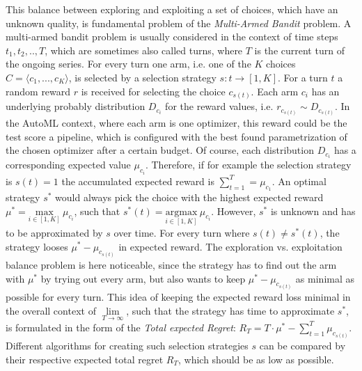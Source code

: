 This balance between exploring and exploiting a set of choices, which have an unknown quality, is fundamental problem of the \textit{Multi-Armed Bandit} problem.
A multi-armed bandit problem is usually considered in the context of time steps $t_1, t_2, .., T$, which are sometimes also called turns, where $T$ is the current turn of the ongoing series.
For every turn one arm, i.e. one of the $K$ choices $C = \langle c_1, ..., c_K \rangle$, is selected by a selection strategy $s: t \rightarrow [1,K]$.\newline
For a turn $t$ a random reward $r$ is received for selecting the choice $c_{s(t)}$.
Each arm $c_i$ has an underlying probably distribution $D_{c_i}$ for the reward values, i.e. $r_{c_{s(t)}} \sim D_{c_{s(t)}}$.
In the AutoML context, where each arm is one optimizer, this reward could be the test score a pipeline, which is configured with the best found parametrization of the chosen optimizer after a certain budget.\newline
Of course, each distribution $D_{c_i}$ has a corresponding expected value $\mu_{c_i}$.
Therefore, if for example the selection strategy is $s(t) = 1$ the accumulated expected reward is $\sum_{t=1}^T = \mu_{c_1}$.\newline
An optimal strategy $s^*$ would always pick the choice with the highest expected reward $\mu^* = \underset{i \in [1,K]}{\mathrm{max}} \> \mu_{c_i}$, such that $s^*(t) =\underset{i \in [1,K]}{\mathrm{argmax}} \> \mu_{c_i}$.
However, $s^*$ is unknown and has to be approximated by $s$ over time.\newline
For every turn where $s(t) \neq s^*(t)$, the strategy looses $\mu^* - \mu_{c_{s(t)}}$ in expected reward.
The exploration vs. exploitation balance problem is here noticeable, since the strategy has to find out the arm with $\mu^*$ by trying out every arm, but also wants to keep $\mu^* - \mu_{c_{s(t)}}$ as minimal as possible for every turn.
This idea of keeping the expected reward loss minimal in the overall context of $\underset{T \rightarrow \infty}{\lim}$, such that the strategy has time to approximate $s^*$, is formulated in the form of the \textit{Total expected Regret}: $R_T = T \cdot \mu^* - \sum_{t=1}^{T} \mu_{c_{s(t)}}$.
Different algorithms for creating such selection strategies $s$ can be compared by their respective expected total regret $R_T$, which should be as low as possible.


